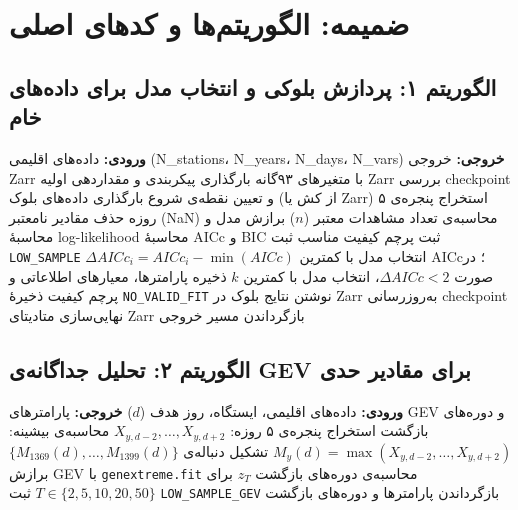 \documentclass[12pt,a4paper,twocolumn]{article}
\begin{document}
\onecolumn
\section*{ضمیمه: الگوریتم‌ها و کدهای اصلی}

\subsection*{الگوریتم ۱: پردازش بلوکی و انتخاب مدل برای داده‌های خام}
\begin{algorithm}[h]
\caption{پردازش بلوکی و انتخاب مدل (داده‌ی خام)}
\begin{algorithmic}[1]
\State \textbf{ورودی:} داده‌های اقلیمی (N\_stations، N\_years، N\_days، N\_vars)
\State \textbf{خروجی:} خروجی Zarr با متغیرهای ۹۳گانه
\State
\State بارگذاری پیکربندی و مقداردهی اولیه Zarr
\State بررسی checkpoint و تعیین نقطه‌ی شروع
	\State بارگذاری داده‌های بلوک (از کش یا Zarr)
			\State استخراج پنجره‌ی ۵ روزه
			\State حذف مقادیر نامعتبر (NaN)
			\State محاسبه‌ی تعداد مشاهدات معتبر ($n$)
					\State برازش مدل و محاسبهٔ log-likelihood
					\State محاسبهٔ AICc و BIC
						\State ثبت پرچم کیفیت مناسب
					\EndIf
				\Else
					\State ثبت \texttt{LOW\_SAMPLE}
				\EndIf
			\EndFor
				\State $\Delta AICc_i = AICc_i - \min(AICc)$
				\State انتخاب مدل با کمترین AICc؛ در صورت $\Delta AICc < 2$، انتخاب مدل با کمترین $k$
				\State ذخیره پارامترها، معیارهای اطلاعاتی و پرچم کیفیت
			\Else
				\State ذخیرهٔ \texttt{NO\_VALID\_FIT}
			\EndIf
		\EndFor
	\EndFor
	\State نوشتن نتایج بلوک در Zarr
	\State به‌روزرسانی checkpoint
\EndFor
\State نهایی‌سازی متادیتای Zarr
\State بازگرداندن مسیر خروجی
\end{algorithmic}
\end{algorithm}

\subsection*{الگوریتم ۲: تحلیل جداگانه‌ی GEV برای مقادیر حدی}
\begin{algorithm}[h]
\caption{تحلیل GEV بر روی بیشینه‌های سالانه‌ی پنجره حول روز تقویمی}
\begin{algorithmic}[1]
\State \textbf{ورودی:} داده‌های اقلیمی، ایستگاه، روز هدف ($d$)
\State \textbf{خروجی:} پارامترهای GEV و دوره‌های بازگشت
\State
{}
	\State استخراج پنجره‌ی ۵ روزه: $X_{y,d-2}, \dots, X_{y,d+2}$
	\State محاسبه‌ی بیشینه: $M_y(d) = \max(X_{y,d-2}, \dots, X_{y,d+2})$
\EndFor
\State تشکیل دنباله‌ی $\{M_{1369}(d), \dots, M_{1399}(d)\}$
	\State برازش GEV با \texttt{genextreme.fit}
	\State محاسبه‌ی دوره‌های بازگشت $z_T$ برای $T \in \{2,5,10,20,50\}$
\Else
	\State ثبت \texttt{LOW\_SAMPLE\_GEV}
\EndIf
\State بازگرداندن پارامترها و دوره‌های بازگشت
\end{algorithmic}
\end{algorithm}
\end{document}
